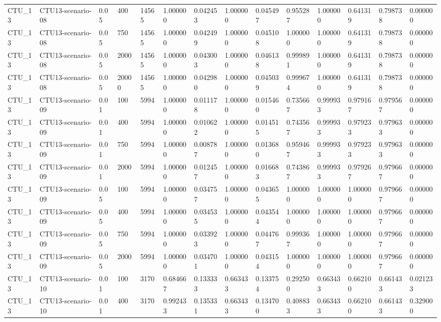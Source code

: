 \begin{tabular}{llllllllllllll}
CTU\_13 & CTU13-scenario-08 & 0.05 & 400 & 14565 & 1.000000 & 0.042453 & 1.000000 & 0.045497 & 0.955287 & 1.000000 & 0.641319 & 0.798738 & 0.000000 \\
CTU\_13 & CTU13-scenario-08 & 0.05 & 750 & 14565 & 1.000000 & 0.042499 & 1.000000 & 0.045108 & 1.000000 & 1.000000 & 0.641319 & 0.798738 & 0.000000 \\
CTU\_13 & CTU13-scenario-08 & 0.05 & 2000 & 14565 & 1.000000 & 0.043003 & 1.000000 & 0.046138 & 0.999891 & 1.000000 & 0.641319 & 0.798738 & 0.000000 \\
CTU\_13 & CTU13-scenario-08 & 0.05 & 20000 & 14565 & 1.000000 & 0.042980 & 1.000000 & 0.045039 & 0.999674 & 1.000000 & 0.641319 & 0.798738 & 0.000000 \\
CTU\_13 & CTU13-scenario-09 & 0.01 & 100 & 5994 & 1.000000 & 0.011178 & 1.000000 & 0.015460 & 0.735667 & 0.999933 & 0.979167 & 0.979567 & 0.000000 \\
CTU\_13 & CTU13-scenario-09 & 0.01 & 400 & 5994 & 1.000000 & 0.010622 & 1.000000 & 0.014515 & 0.743567 & 0.999933 & 0.979233 & 0.979633 & 0.000000 \\
CTU\_13 & CTU13-scenario-09 & 0.01 & 750 & 5994 & 1.000000 & 0.008787 & 1.000000 & 0.013680 & 0.959467 & 0.999933 & 0.979233 & 0.979633 & 0.000000 \\
CTU\_13 & CTU13-scenario-09 & 0.01 & 2000 & 5994 & 1.000000 & 0.012457 & 1.000000 & 0.016683 & 0.743867 & 0.999933 & 0.979267 & 0.979667 & 0.000000 \\
CTU\_13 & CTU13-scenario-09 & 0.05 & 100 & 5994 & 1.000000 & 0.034757 & 1.000000 & 0.043655 & 1.000000 & 1.000000 & 1.000000 & 0.979667 & 0.000000 \\
CTU\_13 & CTU13-scenario-09 & 0.05 & 400 & 5994 & 1.000000 & 0.034535 & 1.000000 & 0.043544 & 1.000000 & 1.000000 & 1.000000 & 0.979667 & 0.000000 \\
CTU\_13 & CTU13-scenario-09 & 0.05 & 750 & 5994 & 1.000000 & 0.033923 & 1.000000 & 0.044767 & 0.999367 & 1.000000 & 1.000000 & 0.979667 & 0.000000 \\
CTU\_13 & CTU13-scenario-09 & 0.05 & 2000 & 5994 & 1.000000 & 0.034701 & 1.000000 & 0.043154 & 1.000000 & 1.000000 & 1.000000 & 0.979667 & 0.000000 \\
CTU\_13 & CTU13-scenario-10 & 0.01 & 100 & 3170 & 0.684667 & 0.133333 & 0.663433 & 0.133754 & 0.292500 & 0.663433 & 0.662100 & 0.661433 & 0.021233 \\
CTU\_13 & CTU13-scenario-10 & 0.01 & 400 & 3170 & 0.992433 & 0.135331 & 0.663433 & 0.134700 & 0.408833 & 0.663433 & 0.662100 & 0.661433 & 0.329000 \\

\end{tabular}
